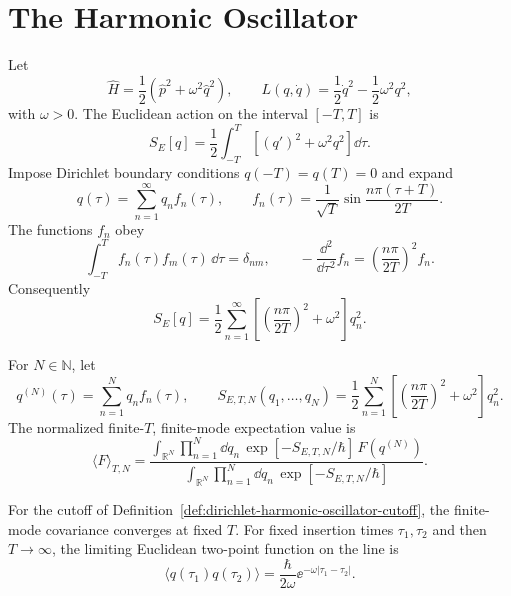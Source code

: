\section{The Harmonic Oscillator}

Let
\[
  \widehat H=\frac12(\widehat p^2+\omega^2\widehat q^2),
  \qquad
  L(q,\dot q)=\frac12\dot q^2-\frac12\omega^2q^2,
\]
with \(\omega>0\). The Euclidean action on the interval \([-T,T]\) is
\[
  S_E[q]
  =
  \frac12\int_{-T}^{T}
  \left[
    (q')^2+\omega^2q^2
  \right]\dd\tau .
\]
Impose Dirichlet boundary conditions \(q(-T)=q(T)=0\) and expand
\[
  q(\tau)=\sum_{n=1}^{\infty}q_nf_n(\tau),
  \qquad
  f_n(\tau)=\frac{1}{\sqrt T}
  \sin\frac{n\pi(\tau+T)}{2T}.
\]
The functions \(f_n\) obey
\[
  \int_{-T}^{T}f_n(\tau)f_m(\tau)\,\dd\tau=\delta_{nm},
  \qquad
  -\frac{\dd^2}{\dd\tau^2}f_n
  =
  \left(\frac{n\pi}{2T}\right)^2f_n .
\]
Consequently
\[
  S_E[q]
  =
  \frac12\sum_{n=1}^{\infty}
  \left[
    \left(\frac{n\pi}{2T}\right)^2+\omega^2
  \right]q_n^2 .
\]

\begin{center}
\end{center}

\begin{definition}
\label{def:dirichlet-harmonic-oscillator-cutoff}
For \(N\in\mathbb N\), let
\[
  q^{(N)}(\tau)=\sum_{n=1}^{N}q_nf_n(\tau),
  \qquad
  S_{E,T,N}(q_1,\ldots,q_N)
  =
  \frac12\sum_{n=1}^{N}
  \left[
    \left(\frac{n\pi}{2T}\right)^2+\omega^2
  \right]q_n^2 .
\]
The normalized finite-\(T\), finite-mode expectation value is
\[
  \langle F\rangle_{T,N}
  =
  \frac{
    \int_{\mathbb R^N}\prod_{n=1}^{N}\dd q_n\,
    \exp[-S_{E,T,N}/\hbar]\,F(q^{(N)})
  }{
    \int_{\mathbb R^N}\prod_{n=1}^{N}\dd q_n\,
    \exp[-S_{E,T,N}/\hbar]
  } .
\]
\end{definition}

\begin{proposition}
\label{prop:harmonic-oscillator-euclidean-covariance-cutoff}
For the cutoff of Definition~\ref{def:dirichlet-harmonic-oscillator-cutoff},
the finite-mode covariance converges at fixed \(T\).  For fixed insertion
times \(\tau_1,\tau_2\) and then \(T\to\infty\), the limiting Euclidean
two-point function on the line is
\[
  \langle q(\tau_1)q(\tau_2)\rangle
  =
  \frac{\hbar}{2\omega}\ee^{-\omega|\tau_1-\tau_2|}.
\]
\end{proposition}

